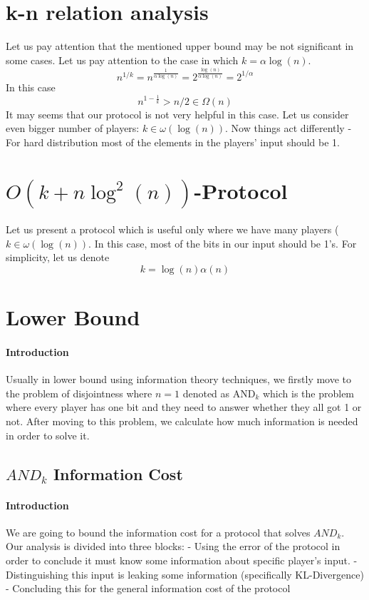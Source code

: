 \documentclass{article}
\theoremstyle{plain}
\begin{document}
\section{k-n relation analysis}
Let us pay attention that the mentioned upper bound may be not significant in some cases. Let us pay attention to the case in which $k = \alpha\log(n)$.
\begin{equation*}
    n^{1/k} = n^{\frac{1}{\alpha\log(n)}} = 2^{\frac{\log(n)}{\alpha\log(n)}} = 2^{1/\alpha}
\end{equation*}
In this case
\begin{equation*}
    n^{1-\frac{1}{k}} > n/2 \in \Omega(n)
\end{equation*}
It may seems that our protocol is not very helpful in this case. \newline
Let us consider even bigger number of players: $k \in \omega(\log(n))$. \newline
Now things act differently - For hard distribution most of the elements in the players' input should be 1. 
\section{$O(k + n\log^{2}(n))$-Protocol}
Let us present a protocol which is useful only where we have many players ($k \in \omega(\log(n))$. In this case, most of the bits in our input should be 1's. For simplicity, let us denote
\begin{equation*}
    k = \log(n) \alpha(n)
\end{equation*}

\section{Lower Bound}
\paragraph{Introduction}
Usually in lower bound using information theory techniques, we firstly move to the problem of disjointness where $n=1$ denoted as $\text{AND}_k$ which is the problem where every player has one bit and they need to answer whether they all got 1 or not. After moving to this problem, we calculate how much information is needed in order to solve it.
\subsection{$AND_k$ Information Cost}
\paragraph{Introduction}
We are going to bound the information cost for a protocol that solves $AND_k$. Our analysis is divided into three blocks:  - Using the error of the protocol in order to conclude it must know some information about specific player's input.  - Distinguishing this input is leaking some information (specifically KL-Divergence)  - Concluding this for the general information cost of the protocol \newline
\end{document}
